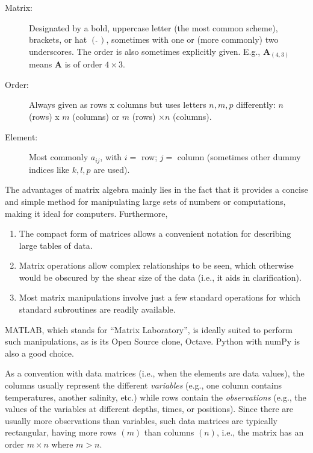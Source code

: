 \begin{description}

\item [Matrix:] Designated by a bold, uppercase letter (the most common scheme), brackets, or hat $(\hat{ \ })$,
sometimes with one or (more commonly) two underscores.
The order is also sometimes explicitly given.  E.g., $\mathbf{A}_{(4,3)}$ means 
$\mathbf A$ is of order $4 \times 3$.

\item [Order:] Always given as rows x columns but uses letters $n,m,p$ differently: $n$ (rows) x $m$ (columns) or 
$m$ (rows) $\times n$ (columns).

\item [Element:] Most commonly $a_{ij}$, with $i =$ row; $j =$ column (sometimes other dummy indices like $k,l,p$ are used).
\end{description}

The advantages of matrix algebra mainly lies in the fact that it provides a concise and simple 
method for manipulating large sets of numbers or computations, making it ideal for computers. 
Furthermore,

\begin{enumerate}

\item The compact form of matrices allows a convenient notation for describing large tables of data.

\item Matrix operations allow complex relationships to be seen, which otherwise would be obscured by the 
shear size of the data (i.e., it aids in clarification).

\item Most matrix manipulations involve just a 
few standard operations for which standard subroutines are readily available.
\end{enumerate}

MATLAB, which stands for ``Matrix Laboratory'', is ideally suited to perform such manipulations,
as is its Open Source clone, Octave. Python with numPy is also a good choice.

	As a convention with data matrices (i.e., when the elements are data values), the columns 
usually represent the different \emph{variables} (e.g., one column contains temperatures, another salinity, 
etc.) while rows contain the \emph{observations} (e.g., the values of the variables at different depths, times, or positions). Since 
there are usually more observations than variables, such data matrices are typically rectangular, having 
more rows $(m)$ than columns $(n)$, i.e., the matrix has an order $m \times n$ where $m > n$.

